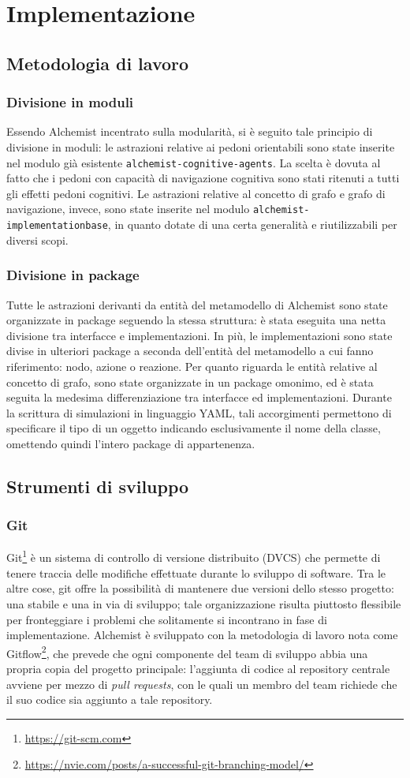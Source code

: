\documentclass[12pt,a4paper,openright,oneside]{book}
\begin{document}
\section{Implementazione}
\subsection{Metodologia di lavoro}
\subsubsection{Divisione in moduli}
Essendo Alchemist incentrato sulla modularità, si è seguito tale principio di divisione in moduli: le astrazioni relative ai pedoni orientabili sono state inserite nel modulo già esistente \texttt{alchemist-cognitive-agents}. La scelta è dovuta al fatto che i pedoni con capacità di navigazione cognitiva sono stati ritenuti a tutti gli effetti pedoni cognitivi. Le astrazioni relative al concetto di grafo e grafo di navigazione, invece, sono state inserite nel modulo \texttt{alchemist-implementationbase}, in quanto dotate di una certa generalità e riutilizzabili per diversi scopi.
\subsubsection{Divisione in package}
Tutte le astrazioni derivanti da entità del metamodello di Alchemist sono state organizzate in package seguendo la stessa struttura: è stata eseguita una netta divisione tra interfacce e implementazioni. In più, le implementazioni sono state divise in ulteriori package a seconda dell'entità del metamodello a cui fanno riferimento: nodo, azione o reazione. Per quanto riguarda le entità relative al concetto di grafo, sono state organizzate in un package omonimo, ed è stata seguita la medesima differenziazione tra interfacce ed implementazioni. Durante la scrittura di simulazioni in linguaggio YAML, tali accorgimenti permettono di specificare il tipo di un oggetto indicando esclusivamente il nome della classe, omettendo quindi l'intero package di appartenenza.
\subsection{Strumenti di sviluppo}
\subsubsection{Git} Git\footnote{\url{https://git-scm.com}} è un sistema di controllo di versione distribuito (DVCS) che permette di tenere traccia delle modifiche effettuate durante lo sviluppo di software. Tra le altre cose, git offre la possibilità di mantenere due versioni dello stesso progetto: una stabile e una in via di sviluppo; tale organizzazione risulta piuttosto flessibile per fronteggiare i problemi che solitamente si incontrano in fase di implementazione. Alchemist è sviluppato con la metodologia di lavoro nota come Gitflow\footnote{\url{https://nvie.com/posts/a-successful-git-branching-model/}}, che prevede che ogni componente del team di sviluppo abbia una propria copia del progetto principale: l'aggiunta di codice al repository centrale avviene per mezzo di \emph{pull requests}, con le quali un membro del team richiede che il suo codice sia aggiunto a tale repository.
\end{document}
